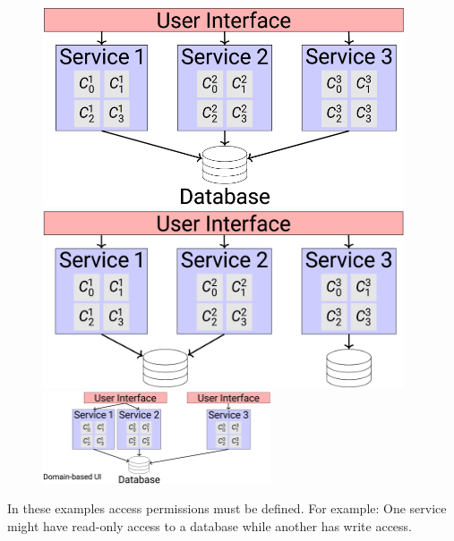 \documentclass[
../../Software_Engineering_Summary.tex,
]
{subfiles}
\begin{document}
\begin{figure}
    [htp]
    \centering
    \begin{minipage}
        [t]{0.47\textwidth}
        \centering
        \includegraphics[width=0.95\textwidth]{Pics/05/ServiceBased1.png}
    \end{minipage}
    \hfill
    \begin{minipage}
        [t]{0.47\textwidth}
        \centering
        \includegraphics[width=0.95\textwidth]{Pics/05/ServiceBased3.png}
    \end{minipage}
    \newline
    \hspace{7pt}
    \includegraphics[width=0.6\textwidth]{Pics/05/ServiceBased2.png}
\end{figure}

In these examples access permissions must be defined. For example: One service might have read-only access to a database while another has write access.
\end{document}
